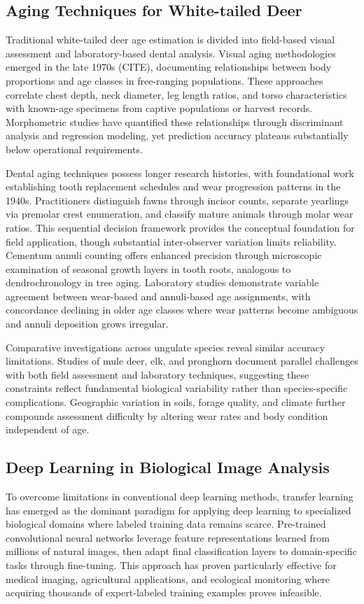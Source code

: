 \documentclass{iopjournal}
\begin{document}

\subsection{Aging Techniques for White-tailed Deer}
Traditional white-tailed deer age estimation is divided into field-based visual assessment and laboratory-based dental analysis. Visual aging methodologies emerged in the late 1970s (CITE), documenting relationships between body proportions and age classes in free-ranging populations. These approaches correlate chest depth, neck diameter, leg length ratios, and torso characteristics with known-age specimens from captive populations or harvest records. Morphometric studies have quantified these relationships through discriminant analysis and regression modeling, yet prediction accuracy plateaus substantially below operational requirements.

Dental aging techniques possess longer research histories, with foundational work establishing tooth replacement schedules and wear progression patterns in the 1940s. Practitioners distinguish fawns through incisor counts, separate yearlings via premolar crest enumeration, and classify mature animals through molar wear ratios. This sequential decision framework provides the conceptual foundation for field application, though substantial inter-observer variation limits reliability. Cementum annuli counting offers enhanced precision through microscopic examination of seasonal growth layers in tooth roots, analogous to dendrochronology in tree aging. Laboratory studies demonstrate variable agreement between wear-based and annuli-based age assignments, with concordance declining in older age classes where wear patterns become ambiguous and annuli deposition grows irregular.

Comparative investigations across ungulate species reveal similar accuracy limitations. Studies of mule deer, elk, and pronghorn document parallel challenges with both field assessment and laboratory techniques, suggesting these constraints reflect fundamental biological variability rather than species-specific complications. Geographic variation in soils, forage quality, and climate further compounds assessment difficulty by altering wear rates and body condition independent of age.

\subsection{Deep Learning in Biological Image Analysis}
To overcome limitations in conventional deep learning methods, transfer learning has emerged as the dominant paradigm for applying deep learning to specialized biological domains where labeled training data remains scarce. Pre-trained convolutional neural networks leverage feature representations learned from millions of natural images, then adapt final classification layers to domain-specific tasks through fine-tuning. This approach has proven particularly effective for medical imaging, agricultural applications, and ecological monitoring where acquiring thousands of expert-labeled training examples proves infeasible.
\end{document}

